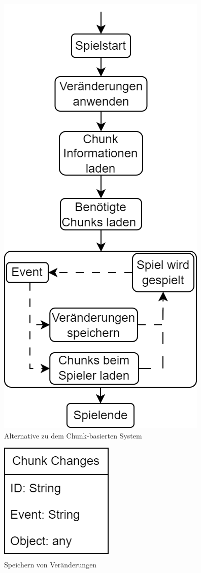 \begin{figure}[H]
    \centering
    \includegraphics[scale=0.5]{images/Chunkbasiert2.png}
    \caption{Alternative zu dem Chunk-basierten System}
    \label{fig:altchunkBasedSystem}
\end{figure}

\begin{figure}[H]
    \centering
    \includegraphics[scale=0.5]{images/Changes.png}
    \caption{Speichern von Veränderungen}
    \label{fig:changesClass}
\end{figure}

